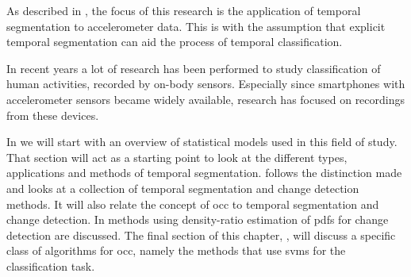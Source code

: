

As described in , the focus of this research is the application of temporal segmentation to accelerometer data.
This is with the assumption that explicit temporal segmentation can aid the process of temporal classification.

In recent years a lot of research has been performed to study classification of human activities, recorded by on-body sensors.
Especially since smartphones with accelerometer sensors became widely available, research has focused on recordings from these devices.

In  we will start with an overview of statistical models used in this field of study.
That section will act as a starting point to look at the different types, applications and methods of temporal segmentation.
 follows the distinction made and looks at a collection of temporal segmentation and change detection methods.
It will also relate the concept of \gls{occ} to temporal segmentation and change detection.
In  methods using density-ratio estimation of \glspl{pdf} for change detection are discussed.
The final section of this chapter, , will discuss a specific class of algorithms for \gls{occ}, namely the methods that use \glspl{svm} for the classification task.

